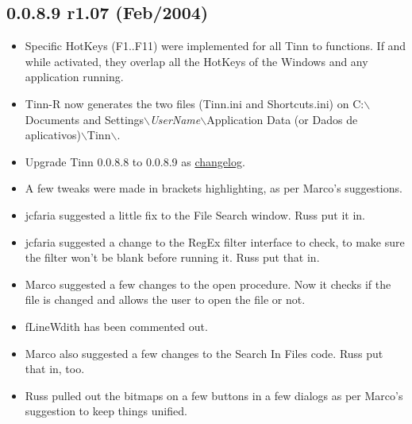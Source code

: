 \subsection*{0.0.8.9 r1.07 (Feb/2004)}
\begin{itemize}
  \item Specific HotKeys (F1..F11) were implemented for all Tinn to \RR{}
    functions. If and while activated, they overlap all the HotKeys of
    the Windows and any application running.
  \item Tinn-R now generates the two files (Tinn.ini and Shortcuts.ini) on
    C:$\backslash$Documents and Settings$\backslash$\textit{UserName}$\backslash$Application Data
    (or Dados de aplicativos)$\backslash$Tinn$\backslash$.
  \item Upgrade Tinn 0.0.8.8 to 0.0.8.9 as
    \href{http://www.solarvoid.com/cgi-bin/viewcvs.cgi/TinnMDI/}{changelog}.
  \item A few tweaks were made in brackets highlighting, as per Marco's suggestions.
  \item jcfaria suggested a little fix to the File Search window. Russ put it in.
  \item jcfaria suggested a change to the RegEx filter interface to check,
    to make sure the filter won't be blank before running it. Russ put that in.
  \item Marco suggested a few changes to the open procedure. Now it checks if the
    file is changed and allows the user to open the file or not.
  \item fLineWdith has been commented out.
  \item Marco also suggested a few changes to the Search In Files code. Russ put that in, too.
  \item Russ pulled out the bitmaps on a few buttons in a few dialogs as per Marco's suggestion to keep things unified.
\end{itemize}


